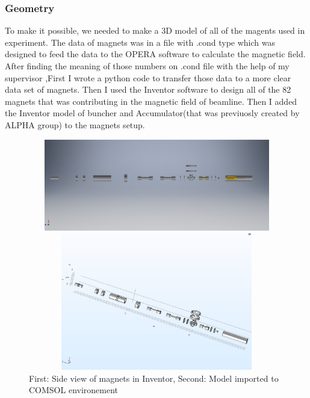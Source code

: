 \documentclass[12pt,a4paper]{article}
\begin{document}
\subsubsection{Geometry}
To make it possible, we needed to make a 3D model of all of the magents used in experiment. The data of magnets was in a file with .cond type which was designed to feed the data to the OPERA software to calculate the magnetic field. After finding the meaning of those numbers on .cond file with the help of my supervisor ,First I wrote a python code to transfer those data to a more clear data set of magnets. Then I used the Inventor software to design all of the 82 magnets that was contributing in the magnetic field of beamline. Then I added the Inventor model of buncher and Accumulator(that was previuosly created by ALPHA group) to the magnets setup.

\begin{figure}[h]
\centering

\includegraphics[width=120mm,
height=40mm]{full-beam-line-half}

\includegraphics[width=120mm, height=60mm]{full-comsol}
\caption{First: Side view of magnets in Inventor, Second: Model imported to COMSOL environement }
\end{figure}
\end{document}
